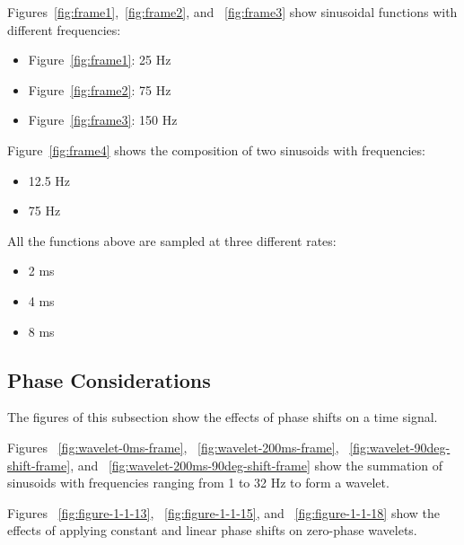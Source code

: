 Figures~\ref{fig:frame1},~\ref{fig:frame2}, and ~\ref{fig:frame3} show sinusoidal functions with different frequencies:
\begin{itemize}
    \item Figure~\ref{fig:frame1}:  25  Hz
    \item Figure~\ref{fig:frame2}:  75  Hz
    \item Figure~\ref{fig:frame3}: 150  Hz
\end{itemize}

Figure~\ref{fig:frame4} shows the composition of two sinusoids with frequencies:
\begin{itemize}
    \item 12.5 Hz
    \item 75   Hz
\end{itemize}

All the functions above are sampled at three different rates:
\begin{itemize}
    \item 2 ms
    \item 4 ms
    \item 8 ms
\end{itemize}


\pagebreak

\subsection{Phase Considerations}

The figures of this subsection show the effects of phase shifts on a time signal.

Figures ~\ref{fig:wavelet-0ms-frame}, ~\ref{fig:wavelet-200ms-frame}, ~\ref{fig:wavelet-90deg-shift-frame}, and ~\ref{fig:wavelet-200ms-90deg-shift-frame} show the summation of sinusoids with frequencies ranging from 1 to 32 Hz to form a wavelet.

Figures ~\ref{fig:figure-1-1-13}, ~\ref{fig:figure-1-1-15}, and ~\ref{fig:figure-1-1-18} show the effects of applying constant and linear phase shifts on zero-phase wavelets.

